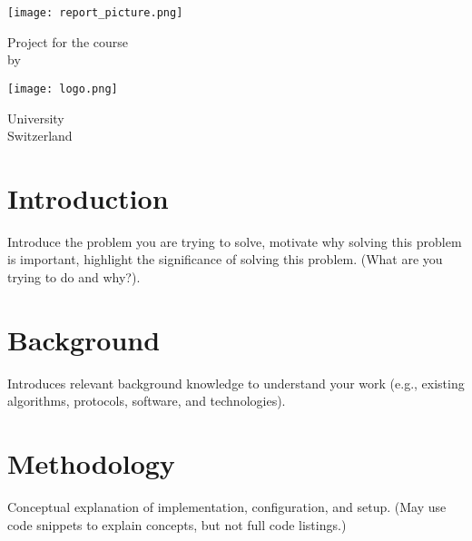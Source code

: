 \documentclass{article} %
\begin{document}
\begin{titlepage}
    \begin{center}
        \vspace*{1cm}

        \Huge
        \textbf{\titlename}

        \vspace{0.5cm}
        \LARGE
        \subtitlename

        \vspace{1.5cm}

        \texttt{[image: report\_picture.png]}

        \vspace{1.5cm}

        Project for the course\\
        \course\hspace{0.01em} by\\
        \textbf{\authorname}

        \vfill
        \texttt{[image: logo.png]}

        \Large
        University \uniname\\
        Switzerland\\
        \semester

    \end{center}
\end{titlepage}

\tableofcontents
\clearpage

\section{Introduction}
Introduce the problem you are trying to solve, motivate why solving this
problem is important, highlight the significance of solving this problem. (What are you trying to
do and why?).\\
\lipsum[1-1] %

\section{Background}
Introduces relevant background knowledge to understand your work (e.g.,
existing algorithms, protocols, software, and technologies).\\
\lipsum[1-1] %
\clearpage

\section{Methodology}
Conceptual explanation of implementation, configuration, and setup. (May use
code snippets to explain concepts, but not full code listings.)\\
\lipsum[1-2]
\clearpage
\end{document}
